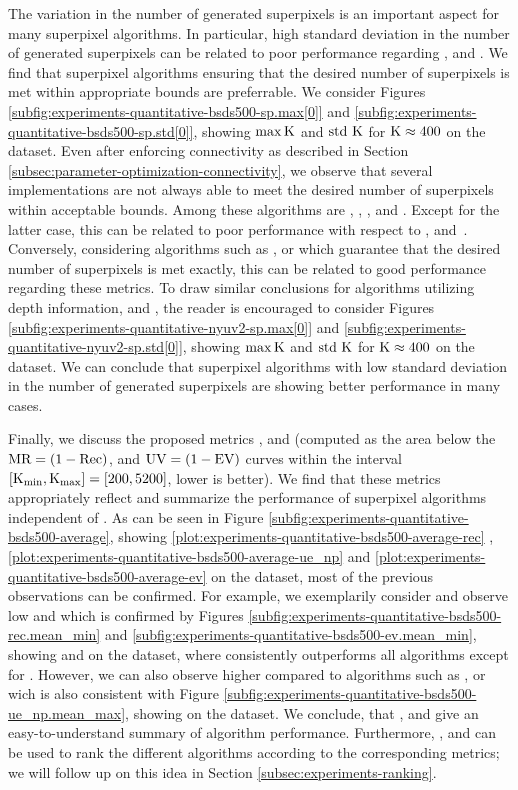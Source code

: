 The variation in the number of generated superpixels is an important aspect
for many superpixel algorithms. In particular, high standard deviation in the number of generated superpixels can be related to
poor performance regarding \Rec, \UE and \EV. We find that superpixel algorithms ensuring that
the desired number of superpixels is met within appropriate bounds are preferrable. We consider
Figures \ref{subfig:experiments-quantitative-bsds500-sp.max[0]} and \ref{subfig:experiments-quantitative-bsds500-sp.std[0]},
showing $\max\text{K}$ and $\text{std }\text{K}$ for $\text{K} \approx 400$ on the \BSDS dataset. Even after enforcing connectivity
as described in Section \ref{subsec:parameter-optimization-connectivity}, we observe
that several implementations are not always able to meet the desired number of superpixels
within acceptable bounds. Among these algorithms are \QSr, \VCr, \FHr, \CISr and \LSCr.
Except for the latter case, this can be related to poor performance with respect
to \Rec, \UE and~\EV. Conversely, considering algorithms such as \ETPSr, \ERGCr or \ERSr
which guarantee that the desired number of superpixels is met exactly, this can be
related to good performance regarding these metrics. To draw similar conclusions
for algorithms utilizing depth information, \ie \DASP and \VCCS,
the reader is encouraged to consider
Figures \ref{subfig:experiments-quantitative-nyuv2-sp.max[0]} and \ref{subfig:experiments-quantitative-nyuv2-sp.std[0]},
showing $\max\text{K}$ and $\text{std }\text{K}$ for $\text{K}\approx 400$ on the \NYU dataset.
We can conclude that superpixel algorithms with low standard deviation in the number
of generated superpixels are showing better performance in many cases.

Finally, we discuss the proposed metrics \ARec, \AUE and \AEV (computed as the area
below the $\text{MR} = (1 - \text{Rec})$, \UE and $\text{UV} = (1 - \text{EV})$ curves within the interval $[\text{K}_{\min}, \text{K}_{\max}] = [200,5200]$, \ie lower is better).
We find that these metrics appropriately reflect and summarize the performance of superpixel
algorithms independent of \K. As can be seen in Figure \ref{subfig:experiments-quantitative-bsds500-average},
showing \ref{plot:experiments-quantitative-bsds500-average-rec} \ARec, \ref{plot:experiments-quantitative-bsds500-average-ue_np}
\AUE and \ref{plot:experiments-quantitative-bsds500-average-ev} \AEV on the \BSDS dataset, most of the
previous observations can be confirmed. For example, we exemplarily consider \SEEDSr
and observe low \ARec and \AEV which is confirmed by
Figures \ref{subfig:experiments-quantitative-bsds500-rec.mean_min} and \ref{subfig:experiments-quantitative-bsds500-ev.mean_min},
showing \Rec and \EV on the \BSDS dataset, where \SEEDSr consistently outperforms all algorithms except for \ETPSr.
However, we can also observe higher \AUE compared to algorithms such as
\ETPSr, \ERSr or \CRSr wich is also consistent with Figure \ref{subfig:experiments-quantitative-bsds500-ue_np.mean_max},
showing \UE on the \BSDS dataset. We conclude, that \ARec, \AUE and \AEV give an easy-to-understand summary of algorithm performance.
Furthermore, \ARec, \AUE and \AEV can be used to rank the different
algorithms according to the corresponding metrics; we will follow up on this idea in Section \ref{subsec:experiments-ranking}.

